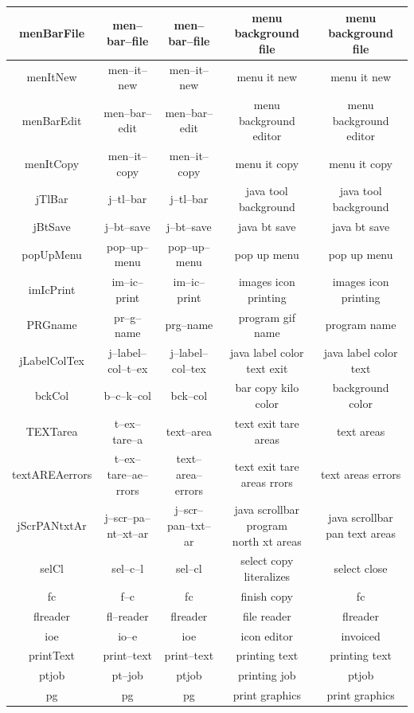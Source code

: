 \begin{table}
\begin{tabular}{| c | c | c | c | c |}
menBarFile&men--bar--file&men--bar--file&menu background file&menu background file\\ \hline
menItNew&men--it--new&men--it--new&menu it new&menu it new\\ \hline
menBarEdit&men--bar--edit&men--bar--edit&menu background editor&menu background editor\\ \hline
menItCopy&men--it--copy&men--it--copy&menu it copy&menu it copy\\ \hline
jTlBar&j--tl--bar&j--tl--bar&java tool background&java tool background\\ \hline
jBtSave&j--bt--save&j--bt--save&java bt save&java bt save\\ \hline
popUpMenu&pop--up--menu&pop--up--menu&pop up menu&pop up menu\\ \hline
imIcPrint&im--ic--print&im--ic--print&images icon printing&images icon printing\\ \hline
PRGname&pr--g--name&prg--name&program gif name&program name\\ \hline
jLabelColTex&j--label--col--t--ex&j--label--col--tex&java label color text exit&java label color text\\ \hline
bckCol&b--c--k--col&bck--col&bar copy kilo color&background color\\ \hline
TEXTarea&t--ex--tare--a&text--area&text exit tare areas&text areas\\ \hline
textAREAerrors&t--ex--tare--ae--rrors&text--area--errors&text exit tare areas rrors&text areas errors\\ \hline
jScrPANtxtAr&j--scr--pa--nt--xt--ar&j--scr--pan--txt--ar&\shortstack{java scrollbar program\\north xt areas}&\shortstack{java scrollbar\\pan text areas} \\ \hline
selCl&sel--c--l&sel--cl&select copy literalizes&select close\\ \hline
fc&f--c&fc&finish copy&fc\\ \hline
flreader&fl--reader&flreader&file reader&flreader\\ \hline
ioe&io--e&ioe&icon editor&invoiced\\ \hline
printText&print--text&print--text&printing text&printing text\\ \hline
ptjob&pt--job&ptjob&printing job&ptjob\\ \hline
pg&pg&pg&print graphics&print graphics\\ \hline

\end{tabular}
\end{table}
